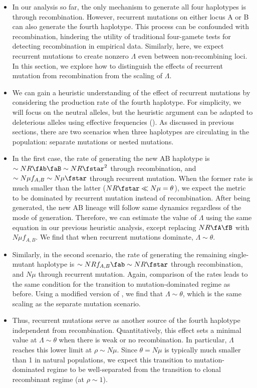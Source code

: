 \documentclass[aps,rmp,twocolumn,groupedaddress,floatfix,notitlepage]{revtex4-1}
\begin{document}
\begin{itemize}
	\item In our analysis so far, the only mechanism to generate all four haplotypes is through recombination. However, recurrent mutations on either locus A or B can also generate the fourth haplotype. This process can be confounded with recombination, hindering the utility of traditional four-gamete tests for detecting recombination in empirical data. Similarly, here, we expect recurrent mutations to create nonzero $\Lambda$ even between non-recombining loci. In this section, we explore how to distinguish the effects of recurrent mutation from recombination from the scaling of $\Lambda$.
	\item We can gain a heuristic understanding of the effect of recurrent mutations by considering the production rate of the fourth haplotype. For simplicity, we will focus on the neutral alleles, but the heuristic argument can be adapted to deleterious alleles using effective frequencies (\secref{}). As discussed in previous sections, there are two scenarios when three haplotypes are circulating in the population: separate mutations or nested mutations.
	\item In the first case, the rate of generating the new AB haplotype is $\sim NR\fAb\faB \sim NR\fstar^2$ through recombination, and $\sim N\mu f_{A,B} \sim N\mu\fstar$ through recurrent mutation. When the former rate is much smaller than the latter ($NR\fstar \ll N\mu = \theta$), we expect the metric to be dominated by recurrent mutation instead of recombination. After being generated, the new AB lineage will follow same dynamics regardless of the mode of generation. Therefore, we can estimate the value of $\Lambda$ using the same equation in our previous heuristic analysis, except replacing $NR\fA\fB$ with $N\mu f_{A,B}$. We find that when recurrent mutations dominate, $\Lambda \sim \theta$.
	\item Similarly, in the second scenario, the rate of generating the remaining single-mutant haplotype is $\sim NRf_{A,B}\fab \sim NR\fstar$ through recombination, and $N\mu$ through recurrent mutation. Again, comparison of the rates leads to the same condition for the transition to mutation-dominated regime as before. Using a modified version of \eq{}, we find that $\Lambda\sim\theta$, which is the same scaling as the separate mutation scenario.
	\item Thus, recurrent mutations serve as another source of the fourth haplotype independent from recombination. Quantitatively, this effect sets a minimal value at $\Lambda \sim \theta$ when there is weak or no recombination. In particular, $\Lambda$ reaches this lower limit at $\rho \sim N\mu$. Since $\theta=N\mu$ is typically much smaller than 1 in natural populations, we expect this transition to mutation-dominated regime to be well-separated from the transition to clonal recombinant regime (at $\rho\sim 1$). 

\end{itemize}
\end{document}
